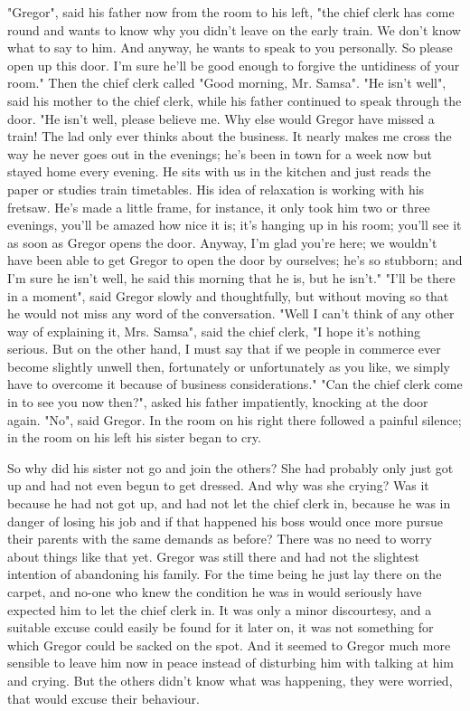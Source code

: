"Gregor", said his father now from the room to his left, "the chief clerk has come round and wants to know why you didn't leave on the early train. We don't know what to say to him. And anyway, he wants to speak to you personally. So please open up this door. I'm sure he'll be good enough to forgive the untidiness of your room." Then the chief clerk called "Good morning, Mr. Samsa". "He isn't well", said his mother to the chief clerk, while his father continued to speak through the door. "He isn't well, please believe me. Why else would Gregor have missed a train! The lad only ever thinks about the business. It nearly makes me cross the way he never goes out in the evenings; he's been in town for a week now but stayed home every evening. He sits with us in the kitchen and just reads the paper or studies train timetables. His idea of relaxation is working with his fretsaw. He's made a little frame, for instance, it only took him two or three evenings, you'll be amazed how nice it is; it's hanging up in his room; you'll see it as soon as Gregor opens the door. Anyway, I'm glad you're here; we wouldn't have been able to get Gregor to open the door by ourselves; he's so stubborn; and I'm sure he isn't well, he said this morning that he is, but he isn't." "I'll be there in a moment", said Gregor slowly and thoughtfully, but without moving so that he would not miss any word of the conversation. "Well I can't think of any other way of explaining it, Mrs. Samsa", said the chief clerk, "I hope it's nothing serious. But on the other hand, I must say that if we people in commerce ever become slightly unwell then, fortunately or unfortunately as you like, we simply have to overcome it because of business considerations." "Can the chief clerk come in to see you now then?", asked his father impatiently, knocking at the door again. "No", said Gregor. In the room on his right there followed a painful silence; in the room on his left his sister began to cry.

So why did his sister not go and join the others? She had probably only just got up and had not even begun to get dressed. And why was she crying? Was it because he had not got up, and had not let the chief clerk in, because he was in danger of losing his job and if that happened his boss would once more pursue their parents with the same demands as before? There was no need to worry about things like that yet. Gregor was still there and had not the slightest intention of abandoning his family. For the time being he just lay there on the carpet, and no-one who knew the condition he was in would seriously have expected him to let the chief clerk in. It was only a minor discourtesy, and a suitable excuse could easily be found for it later on, it was not something for which Gregor could be sacked on the spot. And it seemed to Gregor much more sensible to leave him now in peace instead of disturbing him with talking at him and crying. But the others didn't know what was happening, they were worried, that would excuse their behaviour.

